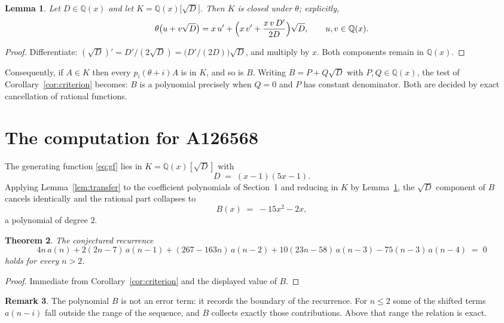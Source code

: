 \documentclass[11pt,a4paper]{article}
\theoremstyle{plain}
\newtheorem{theorem}{Theorem}
\newtheorem{lemma}[theorem]{Lemma}
\theoremstyle{definition}
\newtheorem{remark}[theorem]{Remark}
\begin{document}
\begin{lemma}\label{lem:field}
Let $D\in\mathbb{Q}(x)$ and let $K=\mathbb{Q}(x)\bigl[\sqrt{D}\bigr]$. Then $K$ is closed
under $\theta$; explicitly,
\[
\theta\bigl(u+v\sqrt{D}\bigr)=x\,u'+\Bigl(x\,v'+\frac{x\,v\,D'}{2D}\Bigr)\sqrt{D},
\qquad u,v\in\mathbb{Q}(x).
\]
\end{lemma}

\begin{proof}
Differentiate: $(\sqrt{D})'=D'/(2\sqrt{D})=\bigl(D'/(2D)\bigr)\sqrt{D}$, and multiply by
$x$. Both components remain in $\mathbb{Q}(x)$.
\end{proof}

Consequently, if $A\in K$ then every $p_{i}(\theta+i)A$ is in $K$, and so is $B$. Writing
$B=P+Q\sqrt{D}$ with $P,Q\in\mathbb{Q}(x)$, the test of Corollary~\ref{cor:criterion}
becomes: $B$ is a polynomial precisely when $Q=0$ and $P$ has constant denominator. Both
are decided by exact cancellation of rational functions.

\section{The computation for A126568}

The generating function \eqref{eq:gf} lies in $K=\mathbb{Q}(x)[\sqrt{D}]$ with
\[
D \;=\; \left(x - 1\right) \left(5 x - 1\right) .
\]
Applying Lemma~\ref{lem:transfer} to the coefficient polynomials of Section~1 and reducing
in $K$ by Lemma~\ref{lem:field}, the $\sqrt{D}$ component of $B$ cancels identically and
the rational part collapses to
\[
B(x)\;=\;- 15 x^{2} - 2 x ,
\]
a polynomial of degree $2$.

\begin{theorem}
The conjectured recurrence
\[
4 n\,a(n) + 2 \left(2 n - 7\right)\,a(n-1) + (267 - 163 n)\,a(n-2) + 10 \left(23 n - 58\right)\,a(n-3) -  75 \left(n - 3\right)\,a(n-4) \;=\;0
\]
holds for every $n>2$.
\end{theorem}

\begin{proof}
Immediate from Corollary~\ref{cor:criterion} and the displayed value of $B$.
\end{proof}

\begin{remark}
The polynomial $B$ is not an error term: it records the boundary of the recurrence. For
$n\le2$ some of the shifted terms $a(n-i)$ fall outside the range of the sequence,
and $B$ collects exactly those contributions. Above that range the relation is exact.
\end{remark}
\end{document}
